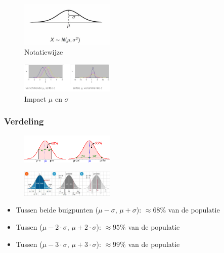 \documentclass{article}
\begin{document}
\begin{figure}[H]
    \centering
    \includegraphics[width=0.4\textwidth]{gauss-notatiewijze.png}
    \caption{Notatiewijze}
\end{figure}

\begin{figure}[H]
    \centering
    \includegraphics[width=0.4\textwidth]{gauss-verschillend.png}
    \caption{Impact $\mu$ en $\sigma$}
\end{figure}

\subsubsection{Verdeling}

\begin{figure}[H]
    \centering
    \includegraphics[width=0.4\textwidth]{gauss-verdeling.png}
\end{figure}

\begin{figure}[H]
    \centering
    \includegraphics[width=0.4\textwidth]{gauss-verdeling2.png}
\end{figure}


\begin{itemize}
    \item Tussen beide buigpunten ($\mu - \sigma$, $\mu + \sigma$): $\approx68\%$ van de populatie
    \item Tussen ($\mu - 2\cdot\sigma$, $\mu + 2\cdot\sigma$): $\approx95\%$ van de populatie
    \item Tussen ($\mu - 3\cdot\sigma$, $\mu + 3\cdot\sigma$): $\approx99\%$ van de populatie
\end{itemize}
\end{document}
